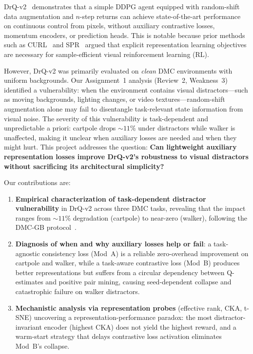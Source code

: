 \documentclass{article}
\begin{document}
DrQ-v2~\citep{yarats2022mastering} demonstrates that a simple DDPG agent equipped with random-shift data augmentation and $n$-step returns can achieve state-of-the-art performance on continuous control from pixels, without auxiliary contrastive losses, momentum encoders, or prediction heads.
This is notable because prior methods such as CURL~\citep{srinivas2020curl} and SPR~\citep{schwarzer2021data} argued that explicit representation learning objectives are necessary for sample-efficient visual reinforcement learning (RL).

However, DrQ-v2 was primarily evaluated on \emph{clean} DMC environments with uniform backgrounds.
Our Assignment~1 analysis (Review~2, Weakness~3) identified a vulnerability: when the environment contains visual distractors---such as moving backgrounds, lighting changes, or video textures---random-shift augmentation alone may fail to disentangle task-relevant state information from visual noise.
The severity of this vulnerability is task-dependent and unpredictable a priori: cartpole drops ${\sim}11\%$ under distractors while walker is unaffected, making it unclear when auxiliary losses are needed and when they might hurt.
This project addresses the question: \textbf{Can lightweight auxiliary representation losses improve DrQ-v2's robustness to visual distractors without sacrificing its architectural simplicity?}

Our contributions are:
\begin{enumerate}
  \item \textbf{Empirical characterization of task-dependent distractor vulnerability} in DrQ-v2 across three DMC tasks, revealing that the impact ranges from ${\sim}11\%$ degradation (cartpole) to near-zero (walker), following the DMC-GB protocol~\citep{hansen2021softda}.
  \item \textbf{Diagnosis of when and why auxiliary losses help or fail}: a task-agnostic consistency loss (Mod~A) is a reliable zero-overhead improvement on cartpole and walker, while a task-aware contrastive loss (Mod~B) produces better representations but suffers from a circular dependency between Q-estimates and positive pair mining, causing seed-dependent collapse and catastrophic failure on walker distractors.
  \item \textbf{Mechanistic analysis via representation probes} (effective rank, CKA, t-SNE) uncovering a representation-performance paradox: the most distractor-invariant encoder (highest CKA) does not yield the highest reward, and a warm-start strategy that delays contrastive loss activation eliminates Mod~B's collapse.
\end{enumerate}
\end{document}
